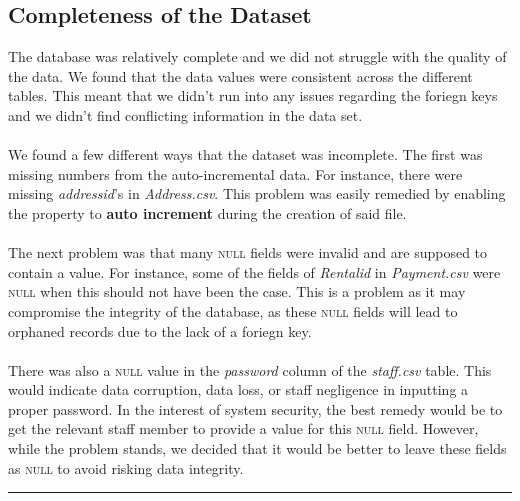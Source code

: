 \documentclass[openany]{article}
\begin{document}
\subsection{Completeness of the Dataset}
	The database was relatively complete and we did not struggle with the quality of the data. We found that the data values were consistent across the different tables. This meant
	 that we didn’t run into any issues regarding the foriegn keys and we didn’t find conflicting information in the data set.
	\\\\
	We found a few different ways that the dataset was incomplete. The first was missing numbers from the auto-incremental data. For instance,
	 there were missing \emph{address\textunderscore id}’s in \emph{Address.csv}. This problem was easily remedied by enabling the property to \textbf{auto increment} during the creation of said file. 
	\\\\
	The next problem was
	 that many \textsc{null} fields were invalid and are supposed to contain a value. 
	For instance, some of the fields of \emph{Rental\textunderscore id} in \emph{Payment.csv} were \textsc{null} when this should not have been the case. This is a problem as it 
	may compromise the integrity
	 of the database, as these \textsc{null} fields will lead to orphaned records due to the lack of a foriegn key.
	\\\\
	There was also a \textsc{null} value in the \emph{password} column of the \emph{staff.csv} table. This would indicate data corruption, data loss, or staff negligence in inputting a proper password. In the interest of system security, the best remedy would be to get the relevant staff member to provide a value for this \textsc{null} field. However, while the problem stands, we decided that it would be better to leave these fields as \textsc{null} to avoid risking data integrity.
	\\
	\rule{\textwidth}{0.4pt}
\end{document}
